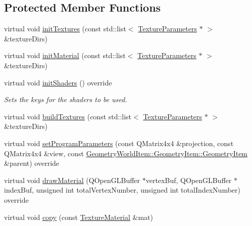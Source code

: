 \subsection*{Protected Member Functions}
\begin{DoxyCompactItemize}
\item 
virtual void \mbox{\hyperlink{class_geometry_engine_1_1_geometry_material_1_1_texture_material_ae2a34b3c00d6aecd9bdc686042cdf892}{init\+Textures}} (const std\+::list$<$ \mbox{\hyperlink{class_geometry_engine_1_1_geometry_material_1_1_texture_parameters}{Texture\+Parameters}} $\ast$ $>$ \&texture\+Dirs)
\item 
virtual void \mbox{\hyperlink{class_geometry_engine_1_1_geometry_material_1_1_texture_material_afbf7007e9d869b23dfbc173841ba5b34}{init\+Material}} (const std\+::list$<$ \mbox{\hyperlink{class_geometry_engine_1_1_geometry_material_1_1_texture_parameters}{Texture\+Parameters}} $\ast$ $>$ \&texture\+Dirs)
\item 
\mbox{\label{class_geometry_engine_1_1_geometry_material_1_1_texture_material_a3c7934e5895c1abc1216e0c700626263}} 
virtual void \mbox{\hyperlink{class_geometry_engine_1_1_geometry_material_1_1_texture_material_a3c7934e5895c1abc1216e0c700626263}{init\+Shaders}} () override
\begin{DoxyCompactList}\small\item\em Sets the keys for the shaders to be used. \end{DoxyCompactList}\item 
virtual void \mbox{\hyperlink{class_geometry_engine_1_1_geometry_material_1_1_texture_material_a39212e653a556734e261ef610ab0ad9f}{build\+Textures}} (const std\+::list$<$ \mbox{\hyperlink{class_geometry_engine_1_1_geometry_material_1_1_texture_parameters}{Texture\+Parameters}} $\ast$ $>$ \&texture\+Dirs)
\item 
virtual void \mbox{\hyperlink{class_geometry_engine_1_1_geometry_material_1_1_texture_material_a985cdde7240f2acb18cd2944c5ca6193}{set\+Program\+Parameters}} (const Q\+Matrix4x4 \&projection, const Q\+Matrix4x4 \&view, const \mbox{\hyperlink{class_geometry_engine_1_1_geometry_world_item_1_1_geometry_item_1_1_geometry_item}{Geometry\+World\+Item\+::\+Geometry\+Item\+::\+Geometry\+Item}} \&parent) override
\item 
virtual void \mbox{\hyperlink{class_geometry_engine_1_1_geometry_material_1_1_texture_material_a7bb3c956fa64e47b251d882890c931f9}{draw\+Material}} (Q\+Open\+G\+L\+Buffer $\ast$vertex\+Buf, Q\+Open\+G\+L\+Buffer $\ast$index\+Buf, unsigned int total\+Vertex\+Number, unsigned int total\+Index\+Number) override
\item 
virtual void \mbox{\hyperlink{class_geometry_engine_1_1_geometry_material_1_1_texture_material_a946658ad56ad140e6e5ec5d12a15affc}{copy}} (const \mbox{\hyperlink{class_geometry_engine_1_1_geometry_material_1_1_texture_material}{Texture\+Material}} \&mat)
\end{DoxyCompactItemize}
